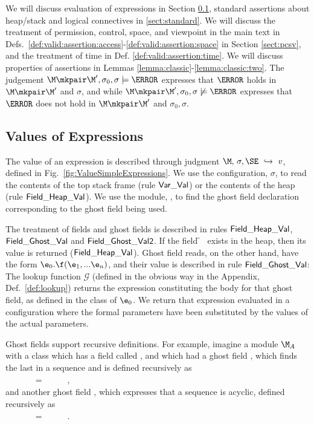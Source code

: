 We will discuss evaluation of expressions in Section \ref{sect:expressions},  standard assertions about heap/stack and logical
 connectives in \ref{sect:standard}. 
 We will discuss the treatment of  permission, control, space, and viewpoint  in 
the main text in  Defs.~\ref{def:valid:assertion:access}-\ref{def:valid:assertion:space}  in Section \ref{sect:pcsv}, and  %
the treatment of time in Def. \ref{def:valid:assertion:time}.
We will discuss properties of assertions in Lemmas \ref{lemma:classic}-\ref{lemma:classic:two}.
 The judgement $\M\mkpair \M', \sigma_0 ,  \sigma  \models \A$ expresses that $\A$ holds in  $\M\mkpair \M'$ and $\sigma$, and 
while $\M\mkpair \M', \sigma_0 , \sigma  \not\models \A$  expresses that $\A$ does not hold  in  $\M\mkpair \M'$ and $\sigma_0,\sigma$.
 
\subsection{Values of Expressions}
\label{sect:expressions}

The value  of  an expression  is described through judgment $ \M,\, \sigma, \SE \ \hookrightarrow\  v$,
defined in Fig.~\ref{fig:ValueSimpleExpressions}.
We use the configuration, $\sigma$, to read the contents of the top stack frame
(rule ${\sf {Var\_Val}}$) or the contents of the heap (rule
${\sf {Field\_Heap\_Val}}$). We use the module, \M, to find the  ghost field declaration corresponding to the
ghost field being used. 

The treatment of fields and ghost fields is described in rules ${\sf {Field\_Heap\_Val}}$,\\  ${\sf {Field\_Ghost\_Val}}$ and 
${\sf {Field\_Ghost\_Val2}}$.  If the field \f~ exists in the heap, then its value is returned (${\sf {Field\_Heap\_Val}}$). 
Ghost field reads, on the other hand, have the form $\e_0.\f(\e_1,...\e_n)$, and their value is
described in rule ${\sf {Field\_Ghost\_Val}}$:
%
The lookup function $\mathcal G$  (defined in the obvious way in the Appendix, Def.~\ref{def:lookup})
returns the expression constituting the body for that ghost field, as defined in the class of $\e_0$.
We return  that expression
evaluated in a configuration where the formal parameters have been substituted by the values of the actual
parameters.

Ghost fields support recursive definitions. For example, imagine a module $\M_A$ with
a class  which has a field called , and which 
had a ghost field , which finds  the last  in a sequence
and is defined recursively as \\
$~ \strut \hspace{.1cm}$ \ \ \ \ \ =\   \  \  \ ,\\
and another ghost field , which expresses that a sequence is acyclic,
defined recursively as \\
$~ \strut \hspace{.1cm}$ \ \ \ \ \ =\   \  \  \ .

